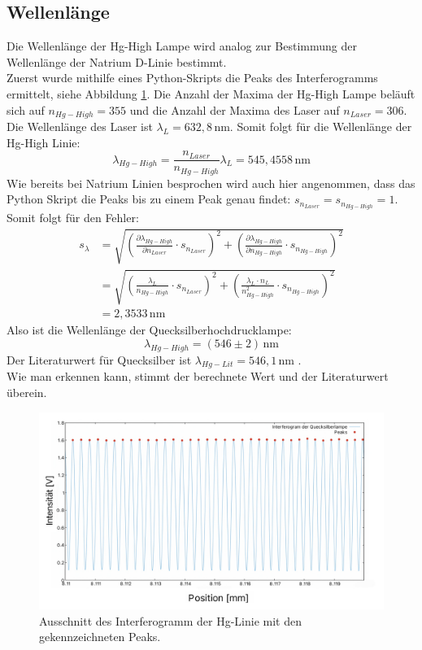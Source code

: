\subsection{Wellenlänge}
Die Wellenlänge der Hg-High Lampe wird analog zur Bestimmung der Wellenlänge der Natrium D-Linie bestimmt.\\
Zuerst wurde mithilfe eines Python-Skripts die Peaks des Interferogramms ermittelt, siehe Abbildung \ref{fig:PHgHigh}. 
Die Anzahl der Maxima der Hg-High Lampe beläuft sich auf $n_{Hg-High} = 355$ und die Anzahl der Maxima des Laser 
auf $n_{Laser} = 306$. Die Wellenlänge des Laser ist $\lambda_L = 632,8\,$nm. Somit folgt für die Wellenlänge
der Hg-High Linie:
\begin{equation}
    \lambda_{Hg-High} = \frac{n_{Laser}}{n_{Hg-High}} \lambda_L = 545,4558\,\text{nm}
\end{equation}
Wie bereits bei Natrium Linien besprochen wird auch hier angenommen, dass das Python Skript die Peaks 
bis zu einem Peak genau findet: $s_{n_{Laser}} = s_{n_{Hg-High}} = 1$.\\
Somit folgt für den Fehler:
\begin{align}
    s_{\lambda} &= \sqrt{\left( \frac{\partial \lambda_{Hg-High}}{\partial n_{Laser}}\cdot s_{n_{Laser}}\right)^2+ \left(\frac{\partial \lambda_{Hg-High}}{\partial n_{Hg-High}}\cdot s_{n_{Hg-High}}\right)^2}\\
                &= \sqrt{\left(\frac{\lambda_L}{n_{Hg-High}} \cdot s_{n_{Laser}}\right)^2 + \left(\frac{\lambda_L \cdot n_L}{n^2_{Hg-High}} \cdot s_{n_{Hg-High}}\right)^2 }\\
                &= 2,3533\,\text{nm}
\end{align}
Also ist die Wellenlänge der Quecksilberhochdrucklampe:
\begin{equation}
    \lambda_{Hg-High} = (546 \pm 2)\,\text{nm}
\end{equation}
Der Literaturwert für Quecksilber ist $\lambda_{Hg-Lit} = 546,1\,$nm \citep[vgl.][]{Zusatzliteratur}.\\ Wie man erkennen kann, stimmt
der berechnete Wert und der Literaturwert überein.\\
\begin{figure}[h]
    \centering
    \includegraphics[scale=0.25]{Bilder/Anna/PeaksHigh.jpg}
    \caption{Ausschnitt des Interferogramm der Hg-Linie mit den gekennzeichneten Peaks.}
    \label{fig:PHgHigh}
\end{figure}

